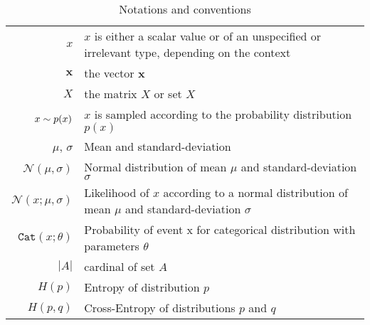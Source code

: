 \documentclass[11pt,leqno]{report}
\begin{document}
\begin{table}[h]
    \centering
    \begin{tabular}{r|l}
        $x$ & $x$ is either a scalar value or of an unspecified or irrelevant type, depending on the context \\
        $\textbf{x}$ & the vector $\textbf{x}$ \\
        $X$ & the matrix $X$ or set $X$\\
        $x \sim p(x)$ & $x$ is sampled according to the probability distribution $p(x)$ \\
        $\mu$, $\sigma$ & Mean and standard-deviation \\
        $\mathcal{N}(\mu, \sigma)$ & Normal distribution of mean $\mu$ and standard-deviation $\sigma$ \\
        $\mathcal{N}(x ; \mu, \sigma)$ & Likelihood of $x$ according to a normal distribution of mean $\mu$ and standard-deviation $\sigma$ \\
        $\texttt{Cat}(x ; \theta)$ & Probability of event x for categorical distribution with parameters $\theta$ \\
        $|A|$ & cardinal of set $A$ \\
        $H(p)$ & Entropy of distribution $p$ \\
        $H(p, q)$ & Cross-Entropy of distributions $p$ and $q$ \\
    \end{tabular}
    \caption{Notations and conventions}
    \label{tab:notations}
\end{table}


\end{document}
